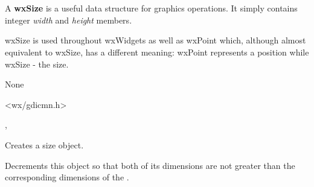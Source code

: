 
\section{}\label{wxsize}

A {\bf wxSize} is a useful data structure for graphics operations.
It simply contains integer {\it width} and {\it height} members.

wxSize is used throughout wxWidgets as well as wxPoint which, although almost
equivalent to wxSize, has a different meaning: wxPoint represents a position
while wxSize - the size.



None


<wx/gdicmn.h>


, 



\label{wxsizector}



Creates a size object.



\label{wxsizedecto}


Decrements this object so that both of its dimensions are not greater than the
corresponding dimensions of the .




\label{wxsizeisfullyspecified}

